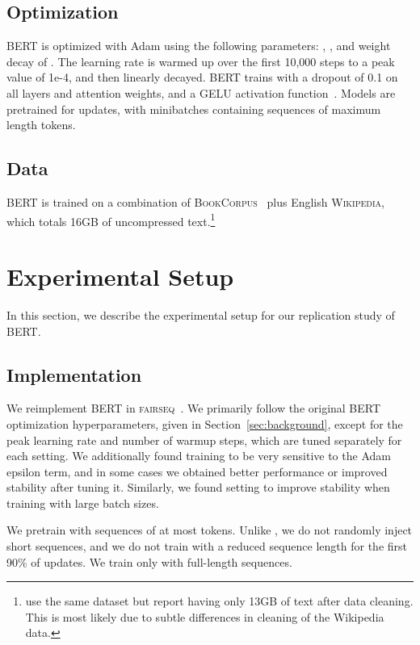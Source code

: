 \documentclass[11pt]{article}
\begin{document}
\subsection{Optimization}

BERT is optimized with Adam \cite{kingma2014adam} using the following parameters: , ,  and  weight decay of . The learning rate is warmed up over the first 10,000 steps to a peak value of 1e-4, and then linearly decayed. BERT trains with a dropout of 0.1 on all layers and attention weights, and a GELU activation function~\cite{hendrycks2016gelu}. Models are pretrained for  updates, with minibatches containing  sequences of maximum length  tokens.

\subsection{Data}

BERT is trained on a combination of \textsc{BookCorpus}~\cite{moviebook} plus English \textsc{Wikipedia}, which totals 16GB of uncompressed text.\footnote{ use the same dataset but report having only 13GB of text after data cleaning. This is most likely due to subtle differences in cleaning of the Wikipedia data.}

 \section{Experimental Setup} \label{sec:exp}

In this section, we describe the experimental setup for our replication study of BERT.

\subsection{Implementation} \label{sec:implementation}

We reimplement BERT in \textsc{fairseq}~\cite{ott2019fairseq}.
We primarily follow the original BERT optimization hyperparameters, given in Section~\ref{sec:background}, except for the peak learning rate and number of warmup steps, which are tuned separately for each setting.
We additionally found training to be very sensitive to the Adam epsilon term, and in some cases we obtained better performance or improved stability after tuning it.
Similarly, we found setting  to improve stability when training with large batch sizes.

We pretrain with sequences of at most  tokens.
Unlike , we do not randomly inject short sequences, and we do not train with a reduced sequence length for the first 90\% of updates.
We train only with full-length sequences.
\end{document}
